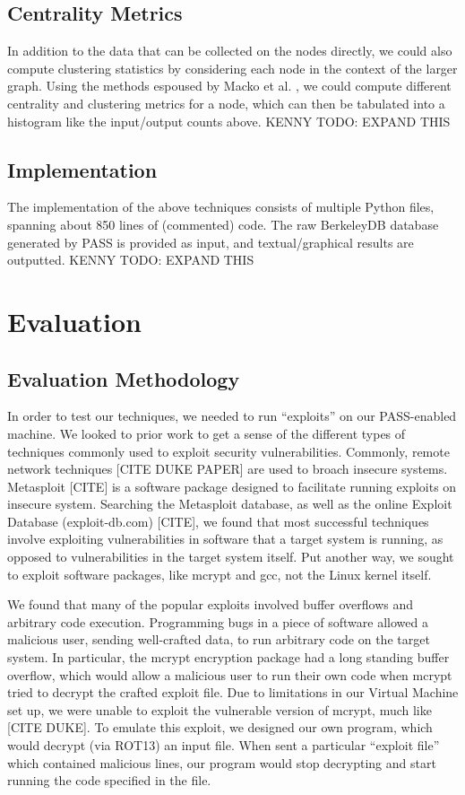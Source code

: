 \documentclass[10pt,twocolumn]{article}
\begin{document}
\subsection{Centrality Metrics}
In addition to the data that can be collected on the nodes directly, we could also compute clustering statistics by considering each node in the context of the larger graph. Using the methods espoused by Macko et al. \cite{clustering}, we could compute different centrality and clustering metrics for a node, which can then be tabulated into a histogram like the input/output counts above. 
KENNY TODO: EXPAND THIS
\subsection{Implementation}
The implementation of the above techniques consists of multiple Python files, spanning about 850 lines of (commented) code. The raw BerkeleyDB database generated by PASS is provided as input, and textual/graphical results are outputted.
KENNY TODO: EXPAND THIS



%

\section{Evaluation}

\subsection{Evaluation Methodology}
In order to test our techniques, we needed to run “exploits” on our PASS-enabled machine. We looked to prior work to get a sense of the different types of techniques commonly used to exploit security vulnerabilities. Commonly, remote network techniques [CITE DUKE PAPER] are used to broach insecure systems. Metasploit [CITE] is a software package designed to facilitate running exploits on insecure system. Searching the Metasploit database, as well as the online Exploit Database (exploit-db.com) [CITE], we found that most successful techniques involve exploiting vulnerabilities in software that a target system is running, as opposed to vulnerabilities in the target system itself. Put another way, we sought to exploit software packages, like mcrypt and gcc, not the Linux kernel itself. 

We found that many of the popular exploits involved buffer overflows and arbitrary code execution. Programming bugs in a piece of software allowed a malicious user, sending well-crafted data, to run arbitrary code on the target system. In particular, the mcrypt encryption package had a long standing buffer overflow, which would allow a malicious user to run their own code when mcrypt tried to decrypt the crafted exploit file. Due to limitations in our Virtual Machine set up, we were unable to exploit the vulnerable version of mcrypt, much like [CITE DUKE]. To emulate this exploit, we designed our own program, which would decrypt (via ROT13) an input file. When sent a particular “exploit file” which contained malicious lines, our program would stop decrypting and start running the code specified in the file.
\end{document}
